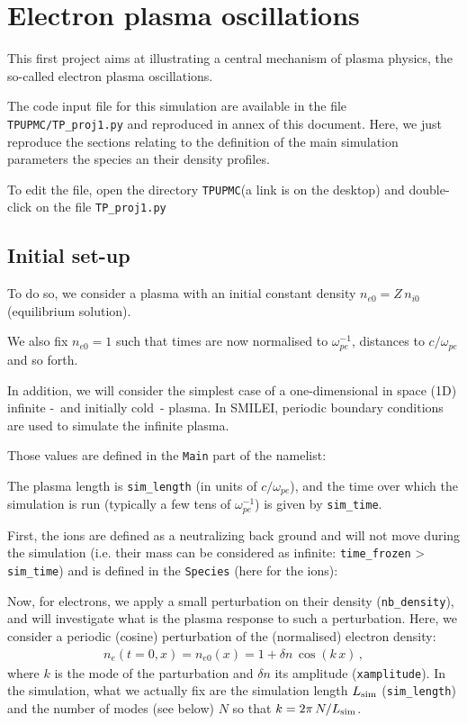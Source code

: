 \documentclass[11pt,a4paper]{article}
\newcommand{\class}[1] {{\color{magenta}\texttt{#1}}}
\newcommand{\code}[1] {{\color{classcolour}\texttt{#1}}}
\newcommand{\param}[1] {{\color{paramcolour}\texttt{#1}}}
\newcommand{\addsubsection}[1] {
\subsection*{#1}
\addcontentsline{toc}{subsection}{#1}}
\begin{document}
\newpage
\section{Electron plasma oscillations}\label{proj1}

This first project aims at illustrating a central mechanism of plasma physics, the so-called electron plasma oscillations.

The code input file for this simulation are available in the file \texttt{TPUPMC/TP\_proj1.py} and reproduced in annex of this document.
Here, we just reproduce the sections relating to the definition of the main simulation parameters the species an their density profiles.

To edit the file, open the directory  \texttt{TPUPMC}(a link is on the desktop)  and double-click on the file  \texttt{TP\_proj1.py} 

\addsubsection{Initial set-up}
To do so, we consider a plasma with an initial  constant density $n_{e0} = Z\,n_{i0}$ (equilibrium solution).

We also fix $n_{e0}=1$ such that times are now normalised to $\omega_{pe}^{-1}$, distances to $c/\omega_{pe}$ and so forth.

In addition, we will consider the simplest case of a one-dimensional in space (1D) infinite -~and initially cold~- plasma.
In SMILEI, periodic boundary conditions are used to simulate the infinite plasma.

Those values are defined in the \class{Main} part of the namelist:


The plasma length is \code{sim\_length}  (in units of $c/\omega_{pe}$), and the time over which the simulation is run (typically a few tens of $\omega_{pe}^{-1}$) is given by \code{sim\_time}. 

First, the ions are defined as a neutralizing back ground and will not move during the simulation (i.e. their mass can be considered as infinite: \code{time\_frozen} > \code{sim\_time}) and is defined in the \class{Species} (here for the ions):


Now, for electrons, we apply a small perturbation on their density (\code{nb\_density}), and will investigate what is the plasma response to such a perturbation.
Here, we consider a periodic (cosine) perturbation of the (normalised) electron density:
\begin{eqnarray}\label{eq_pert}
n_e(t=0,x) = n_{e0}(x) = 1 + \delta n\,\cos(k\,x)\,,
\end{eqnarray}
where $k$ is the mode of the parturbation and $\delta n$ its amplitude (\param{xamplitude}). 
In the simulation, what we actually fix are the simulation length $L_{\rm sim}$ (\code{sim\_length}) and the number of modes (see below) $N$ so that $k=2\pi\,N/L_{\rm sim}$.
\end{document}

